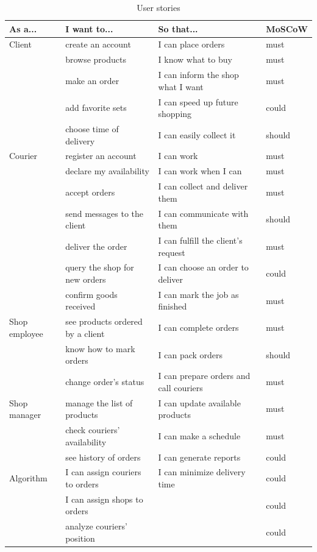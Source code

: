 \documentclass[../main.tex]{subfiles}
\begin{document}
\begin{table}[h!]
    \centering
    \begin{tabular}{l|l|l|l}
        \toprule
        \textbf{As a...} & \textbf{I want to...} & \textbf{So that...} & \textbf{MoSCoW} \\
        \midrule
        Client & create an account & I can place orders & must \\
        & browse products & I know what to buy & must \\
        & make an order & I can inform the shop what I want & must \\
        & add favorite sets & I can speed up future shopping & could \\
        & choose time of delivery & I can easily collect it & should \\
        \midrule
        Courier & register an account & I can work & must \\
        & declare my availability & I can work when I can & must \\
        & accept orders & I can collect and deliver them & must \\
        & send messages to the client & I can communicate with them & should \\
        & deliver the order & I can fulfill the client's request & must \\
        & query the shop for new orders & I can choose an order to deliver & could \\
        & confirm goods received & I can mark the job as finished & must \\
        \midrule
        Shop employee & see products ordered by a client & I can complete orders & must \\
        & know how to mark orders & I can pack orders & should \\
        & change order's status & I can prepare orders and call couriers & must \\
        \midrule
        Shop manager & manage the list of products & I can update available products & must \\
        & check couriers' availability & I can make a schedule & must \\
        & see history of orders & I can generate reports & could\\
        \midrule
        Algorithm & I can assign couriers to orders & I can minimize delivery time & could \\
        & I can assign shops to orders &  & could \\
        & analyze couriers' position & & could \\
        \bottomrule
    \end{tabular}
    \caption{User stories}
    \label{tab:user_stories}
\end{table}
\end{document}
